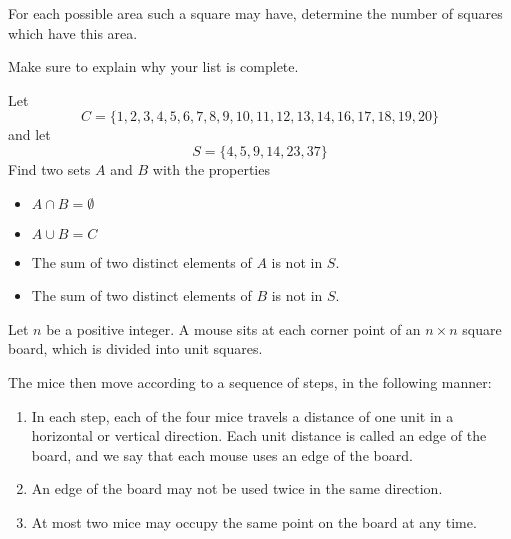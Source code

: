 \documentclass{pset}
\begin{document}
\begin{problems}
\begin{problem}[IrMO 2013 Q7]
\begin{center}
   
    \end{center}
            
    For each possible area such a square may have, determine the number of squares which have this area.
    
    Make sure to explain why your list is complete.
\end{problem}

\begin{problem}[IrMO 2012 Q1]
    Let
    $$
    C=\{1,2,3,4,5,6,7,8,9,10,11,12,13,14,16,17,18,19,20\}
    $$
    and let
    $$
    S=\{4,5,9,14,23,37\}
    $$
    Find two sets \(A\) and \(B\) with the properties
    \begin{itemize}
    \item \(A \cap B=\emptyset\)
\item \(A \cup B=C\)
\item The sum of two distinct elements of \(A\) is not in \(S\).
\item The sum of two distinct elements of \(B\) is not in \(S\).
    \end{itemize}
\end{problem}

\begin{problem}[IrMO 2012 Q10]
    Let \(n\) be a positive integer. A mouse sits at each corner point of an \(n \times n\) square board, which is divided into unit squares.

    The mice then move according to a sequence of steps, in the following manner:
\begin{enumerate}
    \item  In each step, each of the four mice travels a distance of one unit in a horizontal
or vertical direction. Each unit distance is called an edge of the board, and we say that each mouse uses an edge of the board.
\item  An edge of the board may not be used twice in the same direction.
\item At most two mice may occupy the same point on the board at any time.
\end{enumerate}


\end{problem}
\end{problems}
\end{document}
